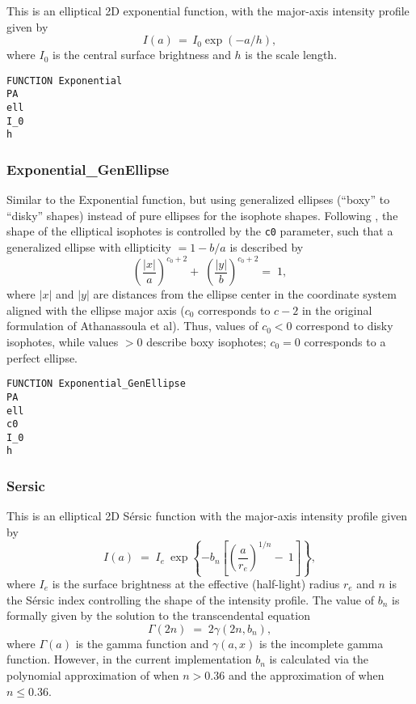 \documentclass[10pt,a4paper,article]{memoir}
\begin{document}
This is an elliptical 2D exponential function, with the major-axis intensity
profile given by
\begin{equation}
I(a) \, = \, I_{0} \exp(-a/h),
\end{equation}
where $I_{0}$ is the central surface brightness and $h$ is the scale length.

\begin{verbatim}
FUNCTION Exponential
PA
ell
I_0
h
\end{verbatim}


\subsubsection{Exponential\_GenEllipse}

Similar to the Exponential function, but using generalized ellipses (``boxy'' to
``disky'' shapes) instead of pure ellipses for the isophote shapes.  Following
\citet{athanassoula90}, the shape of the elliptical isophotes is controlled by
the \texttt{c0} parameter, such that a generalized ellipse with ellipticity $= 1
- b/a$ is described by
\begin{equation}
\left( \frac{|x|}{a} \right)^{c_{0} + 2} \! \! + \; \left( \frac{|y|}{b} \right)^{c_{0} + 2}  = \; 1,
\end{equation}
where $|x|$ and $|y|$ are distances from the ellipse center in the coordinate system
aligned with the ellipse major axis ($c_{0}$ corresponds to $c - 2$ in the original
formulation of Athanassoula et al).
Thus, values of $c_{0} < 0$ correspond to disky isophotes, while values $> 0$ describe boxy
isophotes; $c_{0} = 0$ corresponds to a perfect ellipse.

\begin{verbatim}
FUNCTION Exponential_GenEllipse
PA
ell
c0
I_0
h
\end{verbatim}


\subsubsection{Sersic}

This is an elliptical 2D S\'ersic function with the major-axis intensity
profile given by
\begin{equation}
I(a) \; = \; I_{e} \: \exp \left\{ -b_{n} \left[ \left( \frac{a}{r_{e}} \right)^{1/n} \! - \: 1 \right] \right\},
\end{equation}
where $I_{e}$ is the surface brightness at the effective (half-light) radius $r_{e}$
and $n$ is the S\'ersic index controlling the shape of the intensity profile. The
value of $b_{n}$ is formally given by the solution to the transcendental equation
\begin{equation}
\Gamma(2 n) \; = \; 2 \gamma(2n, b_{n}),
\end{equation}
where $\Gamma(a)$ is the gamma function and $\gamma(a, x)$ is the incomplete gamma function.
However, in the current implementation $b_{n}$ is calculated via the polynomial approximation
of \citet{ciotti99} when $n > 0.36$ and the approximation of \citet{macarthur03} when
$n \leq 0.36$.
\end{document}
